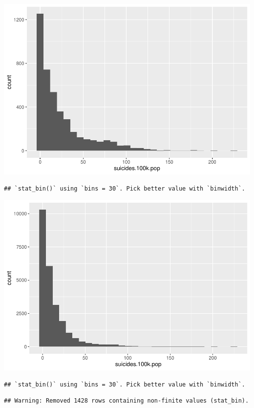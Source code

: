 \documentclass[11pt,]{article}
\begin{document}
\includegraphics{An-Analysis-of-Suicide-Data_files/figure-latex/unnamed-chunk-1-10.pdf}

\begin{verbatim}
## `stat_bin()` using `bins = 30`. Pick better value with `binwidth`.
\end{verbatim}

\includegraphics{An-Analysis-of-Suicide-Data_files/figure-latex/unnamed-chunk-1-11.pdf}

\begin{verbatim}
## `stat_bin()` using `bins = 30`. Pick better value with `binwidth`.
\end{verbatim}

\begin{verbatim}
## Warning: Removed 1428 rows containing non-finite values (stat_bin).
\end{verbatim}
\end{document}
